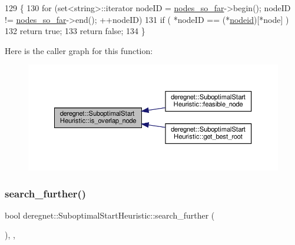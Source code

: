 \begin{DoxyCode}
129                                                          \{
130     \textcolor{keywordflow}{for} (set<string>::iterator nodeID = \hyperlink{classderegnet_1_1SuboptimalStartHeuristic_af9a38b598d55b9a1fa22b9f0c141218b}{nodes\_so\_far}->begin(); nodeID != 
      \hyperlink{classderegnet_1_1SuboptimalStartHeuristic_af9a38b598d55b9a1fa22b9f0c141218b}{nodes\_so\_far}->end(); ++nodeID)
131         \textcolor{keywordflow}{if} ( *nodeID == (*\hyperlink{classderegnet_1_1SuboptimalStartHeuristic_a8928f9630eb2ffbd557e95b62c278103}{nodeid})[*node] )
132             \textcolor{keywordflow}{return} \textcolor{keyword}{true};
133     \textcolor{keywordflow}{return} \textcolor{keyword}{false};
134 \}
\end{DoxyCode}
Here is the caller graph for this function\+:\nopagebreak
\begin{figure}[H]
\begin{center}
\leavevmode
\includegraphics[width=350pt]{classderegnet_1_1SuboptimalStartHeuristic_a911e7e3003bbf92b170a943e714b014e_icgraph}
\end{center}
\end{figure}
\mbox{\label{classderegnet_1_1SuboptimalStartHeuristic_afe38bb6e18c6fb1270537bab0d2a3158}} 
\subsubsection{\texorpdfstring{search\+\_\+further()}{search\_further()}}
{\footnotesize\ttfamily bool deregnet\+::\+Suboptimal\+Start\+Heuristic\+::search\+\_\+further (\begin{DoxyParamCaption}{ }\end{DoxyParamCaption})\hspace{0.3cm}{\ttfamily [override]}, {\ttfamily [private]}, {\ttfamily [virtual]}}



